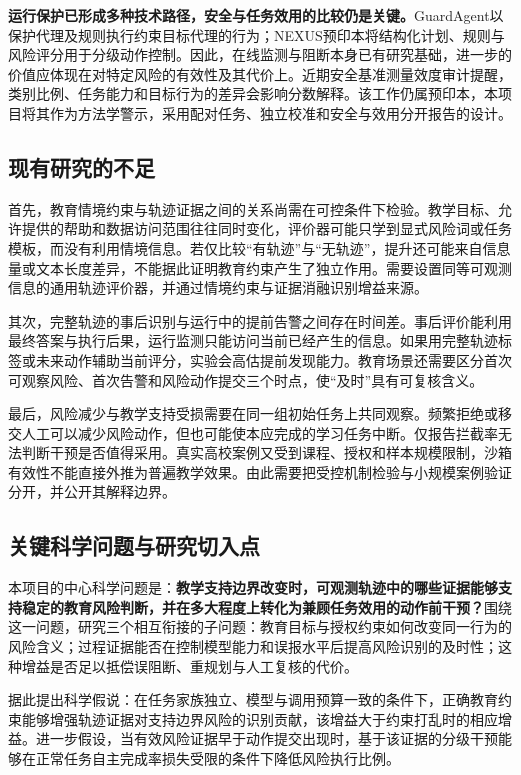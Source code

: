 \textbf{运行保护已形成多种技术路径，安全与任务效用的比较仍是关键。}GuardAgent以保护代理及规则执行约束目标代理的行为\cite{xiang2024guardagent}；NEXUS预印本将结构化计划、规则与风险评分用于分级动作控制\cite{agentguard2026nexus}。因此，在线监测与阻断本身已有研究基础，进一步的价值应体现在对特定风险的有效性及其代价上。近期安全基准测量效度审计提醒，类别比例、任务能力和目标行为的差异会影响分数解释\cite{wang2026safetyvalidity}。该工作仍属预印本，本项目将其作为方法学警示，采用配对任务、独立校准和安全与效用分开报告的设计。

\subsection{现有研究的不足}

首先，教育情境约束与轨迹证据之间的关系尚需在可控条件下检验。教学目标、允许提供的帮助和数据访问范围往往同时变化，评价器可能只学到显式风险词或任务模板，而没有利用情境信息。若仅比较“有轨迹”与“无轨迹”，提升还可能来自信息量或文本长度差异，不能据此证明教育约束产生了独立作用。需要设置同等可观测信息的通用轨迹评价器，并通过情境约束与证据消融识别增益来源。

其次，完整轨迹的事后识别与运行中的提前告警之间存在时间差。事后评价能利用最终答案与执行后果，运行监测只能访问当前已经产生的信息。如果用完整轨迹标签或未来动作辅助当前评分，实验会高估提前发现能力。教育场景还需要区分首次可观察风险、首次告警和风险动作提交三个时点，使“及时”具有可复核含义。

最后，风险减少与教学支持受损需要在同一组初始任务上共同观察。频繁拒绝或移交人工可以减少风险动作，但也可能使本应完成的学习任务中断。仅报告拦截率无法判断干预是否值得采用。真实高校案例又受到课程、授权和样本规模限制，沙箱有效性不能直接外推为普遍教学效果。由此需要把受控机制检验与小规模案例验证分开，并公开其解释边界。

\subsection{关键科学问题与研究切入点}

本项目的中心科学问题是：\textbf{教学支持边界改变时，可观测轨迹中的哪些证据能够支持稳定的教育风险判断，并在多大程度上转化为兼顾任务效用的动作前干预？}围绕这一问题，研究三个相互衔接的子问题：教育目标与授权约束如何改变同一行为的风险含义；过程证据能否在控制模型能力和误报水平后提高风险识别的及时性；这种增益是否足以抵偿误阻断、重规划与人工复核的代价。

据此提出科学假说：在任务家族独立、模型与调用预算一致的条件下，正确教育约束能够增强轨迹证据对支持边界风险的识别贡献，该增益大于约束打乱时的相应增益。进一步假设，当有效风险证据早于动作提交出现时，基于该证据的分级干预能够在正常任务自主完成率损失受限的条件下降低风险执行比例。

